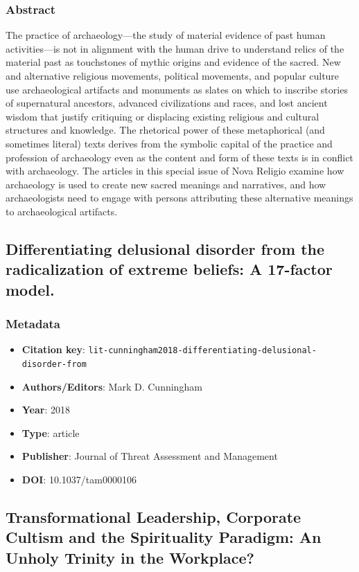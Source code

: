 \subsubsection*{Abstract}
The practice of archaeology—the study of material evidence of past human activities—is not in alignment with the human drive to understand relics of the material past as touchstones of mythic origins and evidence of the sacred. New and alternative religious movements, political movements, and popular culture use archaeological artifacts and monuments as slates on which to inscribe stories of supernatural ancestors, advanced civilizations and races, and lost ancient wisdom that justify critiquing or displacing existing religious and cultural structures and knowledge. The rhetorical power of these metaphorical (and sometimes literal) texts derives from the symbolic capital of the practice and profession of archaeology even as the content and form of these texts is in conflict with archaeology. The articles in this special issue of Nova Religio examine how archaeology is used to create new sacred meanings and narratives, and how archaeologists need to engage with persons attributing these alternative meanings to archaeological artifacts.

\subsection{Differentiating delusional disorder from the radicalization of extreme beliefs: A 17-factor model.}\label{lit:lit-cunningham2018-differentiating-delusional-disorder-from}
\subsubsection*{Metadata}
\begin{itemize}
  \item \textbf{Citation key}: \texttt{lit-cunningham2018-differentiating-delusional-disorder-from}
  \item \textbf{Authors/Editors}: Mark D. Cunningham
  \item \textbf{Year}: 2018
  \item \textbf{Type}: article
  \item \textbf{Publisher}: Journal of Threat Assessment and Management
  \item \textbf{DOI}: 10.1037/tam0000106
\end{itemize}

\subsection{Transformational Leadership, Corporate Cultism and the Spirituality Paradigm: An Unholy Trinity in the Workplace?}\label{lit:lit-tourish2002-transformational-leadership-corporate-cultism}
